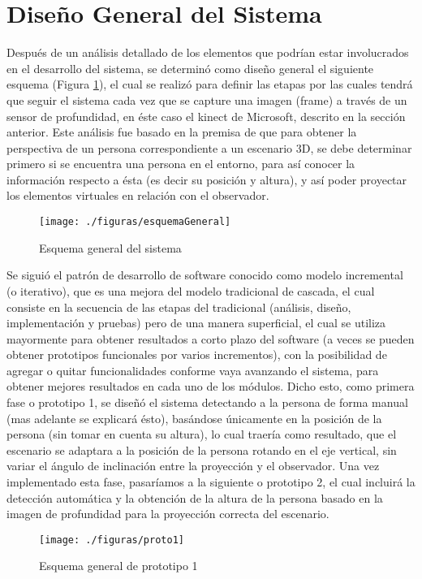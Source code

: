 \documentclass[a4paper,openright,12pt]{report}
\begin{document}
\section{Diseño General del Sistema}
Después de un análisis detallado de los elementos que podrían estar involucrados en el desarrollo del sistema, se determinó como diseño general el siguiente esquema (Figura \ref{fig:esquemaGeneral}), el cual se realizó para definir las etapas por las cuales tendrá que seguir el sistema cada vez que se capture una imagen (frame) a través de un sensor de profundidad, en éste caso el kinect de Microsoft\textcopyright, descrito en la sección anterior. Este análisis fue basado en la premisa de que para obtener la perspectiva de un persona correspondiente a un escenario 3D, se debe determinar primero si se encuentra una persona en el entorno, para así conocer la información respecto a ésta (es decir su posición y altura), y así poder proyectar los elementos virtuales en relación con el observador.\\
\begin{figure}[tbh]
	\centering
	\texttt{[image: ./figuras/esquemaGeneral]}
	\caption{Esquema general del sistema} \label{fig:esquemaGeneral}
\end{figure}
Se siguió el patrón de desarrollo de software conocido como modelo incremental (o iterativo), que es una mejora del modelo tradicional de cascada, el cual consiste en la secuencia de las etapas del tradicional (análisis, diseño,  implementación y pruebas) pero de una manera superficial, el cual se utiliza mayormente para obtener resultados a corto plazo del software (a veces se pueden obtener prototipos funcionales por varios incrementos), con la posibilidad de agregar o quitar funcionalidades conforme vaya avanzando el sistema, para obtener mejores resultados en cada uno de los módulos. Dicho esto, como primera fase o prototipo 1, se diseñó el sistema detectando a la persona de forma manual (mas adelante se explicará ésto), basándose únicamente en la posición de la persona (sin tomar en cuenta su altura), lo cual traería como resultado, que el escenario se adaptara a la posición de la persona rotando en el eje vertical, sin variar el ángulo de inclinación entre la proyección y el observador. Una vez implementado esta fase, pasaríamos a la siguiente o prototipo 2, el cual incluirá la detección automática y la obtención de la altura de la persona basado en la imagen de profundidad para la proyección correcta del escenario.
\begin{figure}[th]
	\centering
	\texttt{[image: ./figuras/proto1]}
	\caption{Esquema general de prototipo 1} \label{fig:proto1}
\end{figure}
\end{document}
